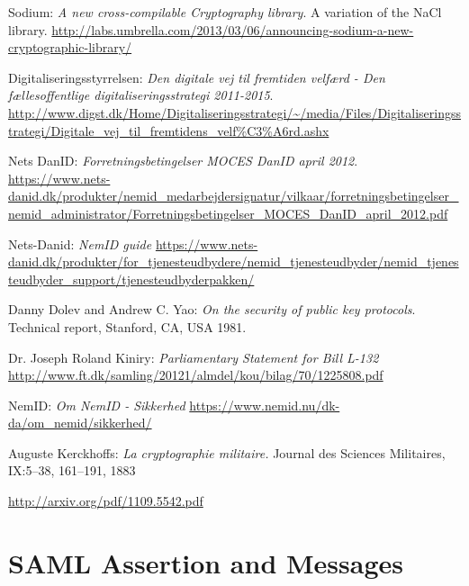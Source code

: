 \documentclass[twosided]{report}
\begin{document}
\begin{thebibliography}{9}
 Sodium:
 \emph{A new cross-compilable Cryptography library}.
 A variation of the NaCl library.
 \url{http://labs.umbrella.com/2013/03/06/announcing-sodium-a-new-cryptographic-library/}

 Digitaliseringsstyrrelsen:
 \emph{Den digitale vej til fremtiden velf{\ae}rd - Den f{\ae}llesoffentlige digitaliseringsstrategi 2011-2015}.
 \url{http://www.digst.dk/Home/Digitaliseringsstrategi/~/media/Files/Digitaliseringsstrategi/Digitale_vej_til_fremtidens_velf\%C3\%A6rd.ashx}

 Nets DanID:
 \emph{Forretningsbetingelser MOCES DanID april 2012}.
 \url{https://www.nets-danid.dk/produkter/nemid_medarbejdersignatur/vilkaar/forretningsbetingelser_nemid_administrator/Forretningsbetingelser_MOCES_DanID_april_2012.pdf}

 Nets-Danid:
 \emph{NemID guide}
 \url{https://www.nets-danid.dk/produkter/for_tjenesteudbydere/nemid_tjenesteudbyder/nemid_tjenesteudbyder_support/tjenesteudbyderpakken/}

 Danny Dolev and Andrew C. Yao:
 \emph{On the security of public key protocols}.
 Technical report, Stanford, CA, USA
 1981.

 Dr. Joseph Roland Kiniry:
 \emph{Parliamentary Statement for Bill L-132}
 \url{http://www.ft.dk/samling/20121/almdel/kou/bilag/70/1225808.pdf}

 NemID:
 \emph{Om NemID - Sikkerhed}
 \url{https://www.nemid.nu/dk-da/om_nemid/sikkerhed/}

 Auguste Kerckhoffs:
 \emph{La cryptographie militaire.}
 Journal des Sciences Militaires, IX:5–38, 161–191, 1883

 \url{http://arxiv.org/pdf/1109.5542.pdf}

\end{thebibliography}

\appendix
\chapter{SAML Assertion and Messages}
\end{document}
